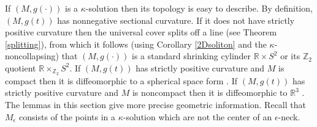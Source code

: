 \documentclass[12pt]{amsart}
\newcommand{\R}{{\mathbb R}}
\newcommand{\Z}{{\mathbb Z}}
\numberwithin{equation}{section}
\theoremstyle{plain}
\theoremstyle{definition}
\theoremstyle{remark}
\begin{document}
If $(M, g(\cdot))$ is a $\kappa$-solution then its
topology is easy to describe.  By definition, $(M, g(t))$ has nonnegative
sectional curvature.  If it does not have strictly positive curvature
then the universal cover splits off a line (see Theorem \ref{splitting}), 
from which
it follows (using Corollary \ref{2Dsoliton} and the $\kappa$-noncollapsing)
that $(M, g(\cdot))$ is a standard shrinking cylinder
$\R \times S^2$ or its $\Z_2$ quotient $\R \times_{\Z_2} S^2$.
If $(M, g(t))$ has strictly positive curvature and $M$ is compact
then it is diffeomorphic to a spherical space form
\cite{Hamiltonnnnn}. 
If $(M, g(t))$ has strictly positive curvature and $M$ is noncompact
then it is diffeomorphic to $\R^3$ \cite{Cheeger-Gromoll}. The lemmas
in this section give more precise geometric information.
Recall that $M_\epsilon$ consists of the points in a $\kappa$-solution
which are not the center of an $\epsilon$-neck.
\end{document}
